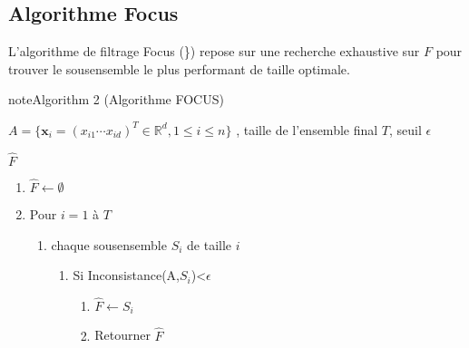 \documentclass[letterpaper,10pt,english]{jupyterBook}
\begin{document}
\subsection{Algorithme Focus}
\label{\detokenize{selection:algorithme-focus}}
\sphinxAtStartPar
L’algorithme de filtrage Focus ({\hyperref[\detokenize{selection:FOCUS}]{}}\}) repose sur une recherche exhaustive sur \(F\) pour trouver le sous\sphinxhyphen{}ensemble le plus performant de taille optimale.
\label{selection:FOCUS}
\begin{sphinxadmonition}{note}{Algorithm 2 (Algorithme FOCUS)}



\sphinxAtStartPar
{} \(A= \{\mathbf x_i=\left (x_{i1} \cdots x_{id} \right )^T\in\mathbb{R}^d,1\leq i\leq n  \}\) , taille de l’ensemble final  \(T\), seuil \(\epsilon\)

\sphinxAtStartPar
{} \(\hat{F}\)
\begin{enumerate}
%
\item {} 
\sphinxAtStartPar
\(\hat{F}\leftarrow \emptyset\)

\item {} 
\sphinxAtStartPar
Pour \(i=1\) à \( T\)
\begin{enumerate}
%
\item {} 
\sphinxAtStartPar
chaque sous\sphinxhyphen{}ensemble \(S_i\) de taille \(i\)
\begin{enumerate}
%
\item {} 
\sphinxAtStartPar
Si Inconsistance(A,\(S_i\))<\(\epsilon\)
\begin{enumerate}
%
\item {} 
\sphinxAtStartPar
\(\hat{F}\leftarrow S_i\)

\item {} 
\sphinxAtStartPar
Retourner \(\hat{F}\)

\end{enumerate}

\end{enumerate}

\end{enumerate}

\end{enumerate}
\end{sphinxadmonition}
\end{document}
